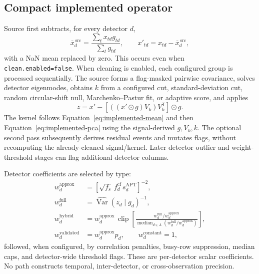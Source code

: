 \documentclass[11pt]{article}
\newcommand{\Var}{\operatorname{Var}}
\newcommand{\code}[1]{\nolinkurl{#1}}
\begin{document}
\subsection{Compact implemented operator}

Source first subtracts, for every detector \(d\),
\begin{equation}
  \bar x_d^{\,\mathrm{src}} =
  \frac{\sum_t x_{td}g_{td}}{\sum_t g_{td}},\qquad
  x'_{td}=x_{td}-\bar x_d^{\,\mathrm{src}},
  \label{eq:implemented-mean}
\end{equation}
with a NaN mean replaced by zero.  This occurs even when
\code{clean.enabled=false}.  When cleaning is enabled, each configured group
is processed sequentially.  The source forms a flag-masked pairwise
covariance, solves detector eigenmodes, obtains \(k\) from a configured cut,
standard-deviation cut, random circular-shift null, Marchenko--Pastur fit, or
adaptive score, and applies
\begin{equation}
  z=x'-\left[((x'\odot g)V_k)V_k^{\mathsf T}\right]\odot g.
  \label{eq:implemented-pca}
\end{equation}
The kernel follows Equation~\eqref{eq:implemented-mean} and then
Equation~\eqref{eq:implemented-pca} using the signal-derived \(g,V_k,k\).
The optional second pass subsequently derives residual events and mutates
flags, without recomputing the already-cleaned signal/kernel.  Later detector
outlier and weight-threshold stages can flag additional detector columns.

Detector coefficients are selected by type:
\begin{align}
  w_d^{\mathrm{approx}} &=
    \left[\sqrt{f_s}\,f^{\mathrm{cf}}_d\,s^{\mathrm{APT}}_d\right]^{-2},
  \label{eq:implemented-approx}\\
  w_d^{\mathrm{full}} &= \widehat{\Var}(z_d\mid g_d)^{-1},
  \label{eq:implemented-full}\\
  w_d^{\mathrm{hybrid}} &=
    w_d^{\mathrm{approx}}\,
    \operatorname{clip}\!\left[
      \frac{w_d^{\mathrm{full}}/w_d^{\mathrm{approx}}}
           {\operatorname{median}_{d\in A}
             (w_d^{\mathrm{full}}/w_d^{\mathrm{approx}})}
    \right],
  \label{eq:implemented-hybrid}\\
  w_d^{\mathrm{validated}} &= w_d^{\mathrm{approx}}p_d,\qquad
  w_d^{\mathrm{constant}}=1,
  \label{eq:implemented-other}
\end{align}
followed, when configured, by correlation penalties, busy-row suppression,
median caps, and detector-wide threshold flags.  These are per-detector scalar
coefficients.  No path constructs temporal, inter-detector, or
cross-observation precision.
\end{document}
